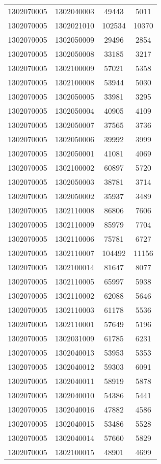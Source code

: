 \begin{longtable}[h]{llcc}
		1302070005 & 1302040003 & 49443 & 5011\\
		1302070005 & 1302021010 & 102534 & 10370\\
		1302070005 & 1302050009 & 29496 & 2854\\
		1302070005 & 1302050008 & 33185 & 3217\\
		1302070005 & 1302100009 & 57021 & 5358\\
		1302070005 & 1302100008 & 53944 & 5030\\
		1302070005 & 1302050005 & 33981 & 3295\\
		1302070005 & 1302050004 & 40905 & 4109\\
		1302070005 & 1302050007 & 37565 & 3736\\
		1302070005 & 1302050006 & 39992 & 3999\\
		1302070005 & 1302050001 & 41081 & 4069\\
		1302070005 & 1302100002 & 60897 & 5720\\
		1302070005 & 1302050003 & 38781 & 3714\\
		1302070005 & 1302050002 & 35937 & 3489\\
		1302070005 & 1302110008 & 86806 & 7606\\
		1302070005 & 1302110009 & 85979 & 7704\\
		1302070005 & 1302110006 & 75781 & 6727\\
		1302070005 & 1302110007 & 104492 & 11156\\
		1302070005 & 1302100014 & 81647 & 8077\\
		1302070005 & 1302110005 & 65997 & 5938\\
		1302070005 & 1302110002 & 62088 & 5646\\
		1302070005 & 1302110003 & 61178 & 5536\\
		1302070005 & 1302110001 & 57649 & 5196\\
		1302070005 & 1302031009 & 61785 & 6231\\
		1302070005 & 1302040013 & 53953 & 5353\\
		1302070005 & 1302040012 & 59303 & 6091\\
		1302070005 & 1302040011 & 58919 & 5878\\
		1302070005 & 1302040010 & 54386 & 5441\\
		1302070005 & 1302040016 & 47882 & 4586\\
		1302070005 & 1302040015 & 53486 & 5528\\
		1302070005 & 1302040014 & 57660 & 5829\\
		1302070005 & 1302100015 & 48901 & 4699\\

\end{longtable}

